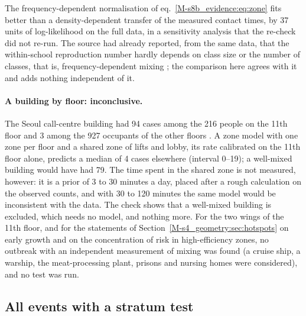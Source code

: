 The frequency-dependent normalisation of eq.~\eqref{M-s8b_evidence:eq:zone} fits better than a
density-dependent transfer of the measured contact times, by 37 units of log-likelihood on the full data, in a
sensitivity analysis that the re-check did not re-run. The source had already reported, from the same data,
that the within-school reproduction number hardly depends on class size or the number of classes, that is,
frequency-dependent mixing \citep{endo2021within}; the comparison here agrees with it and adds nothing
independent of it.

\paragraph{A building by floor: inconclusive.}
The Seoul call-centre building had 94 cases among the 216 people on the 11th floor and 3 among the 927
occupants of the other floors \citep{park2020}. A zone model with one zone per floor and a shared zone of
lifts and lobby, its rate calibrated on the 11th floor alone, predicts a median of 4 cases elsewhere (interval
0--19); a well-mixed building would have had 79. The time spent in the shared zone is not measured, however:
it is a prior of 3 to 30 minutes a day, placed after a rough calculation on the observed counts, and with 30
to 120 minutes the same model would be inconsistent with the data. The check shows that a well-mixed building
is excluded, which needs no model, and nothing more. For the two wings of the 11th floor, and for the
statements of Section~\ref{M-s4_geometry:sec:hotspots} on early growth and on the concentration of risk in
high-efficiency zones, no outbreak with an independent measurement of mixing was found (a cruise ship, a
warship, the meat-processing plant, prisons and nursing homes were considered), and no test was run.

\subsection{All events with a stratum test}

